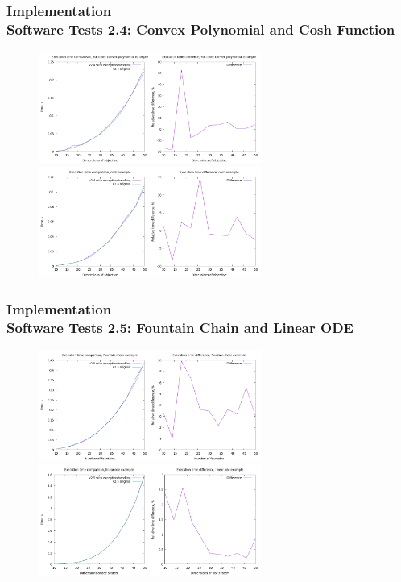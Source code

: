 \documentclass[ucs,10pt]{beamer}
\begin{document}
\begin{frame}
\frametitle{Implementation \\
	\small \color{rwth-blue} Software Tests 2.4: Convex Polynomial and Cosh Function}

	\begin{figure}
		\centering
		\includegraphics[width=0.65\textwidth]{figures/2.4_4th_order_convex_polynomial.png}
		\vspace{0.3cm}
		\includegraphics[width=0.65\textwidth]{figures/2.4_cosh.png}
	\end{figure}
\end{frame}

\begin{frame}
\frametitle{Implementation \\
	\small \color{rwth-blue} Software Tests 2.5: Fountain Chain and Linear ODE}

	\begin{figure}
		\centering
		\includegraphics[width=0.65\textwidth]{figures/2.5_fountain_chain.png}
		\vspace{0.3cm}
		\includegraphics[width=0.65\textwidth]{figures/2.5_linear_ode.png}
	\end{figure}
\end{frame}
\end{document}

